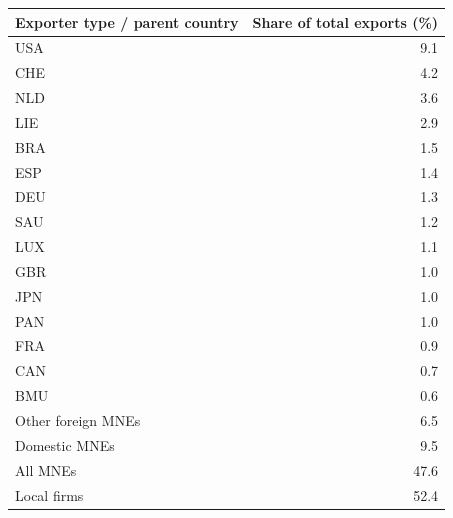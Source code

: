 \begin{tabular}{lr}
\toprule
Exporter type / parent country & Share of total exports (\%) \\
\midrule
USA & 9.1 \\
CHE & 4.2 \\
NLD & 3.6 \\
LIE & 2.9 \\
BRA & 1.5 \\
ESP & 1.4 \\
DEU & 1.3 \\
SAU & 1.2 \\
LUX & 1.1 \\
GBR & 1.0 \\
JPN & 1.0 \\
PAN & 1.0 \\
FRA & 0.9 \\
CAN & 0.7 \\
BMU & 0.6 \\
Other foreign MNEs & 6.5 \\
Domestic MNEs & 9.5 \\
\midrule
All MNEs & 47.6 \\
Local firms & 52.4 \\
\bottomrule
\end{tabular}
